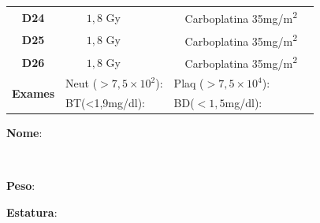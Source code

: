 \documentclass[11pt,a4paper,oldfontcommands]{memoir}
\def\entrywithlabel[#1]#2{\parbox{#1}{{\small #2:} \hrulefill}}
\begin{document}
\begin{center}
\begin{table}[H]
\begin{tabular}{p{1cm}p{2cm}|p{2cm}|p{1cm}|p{4cm}|p{3cm}}
    \multicolumn{1}{c|}{\multirow{1}{*}{\textbf{D24}}}&\multicolumn{1}{c|}{\(1,8\) Gy}&&&{Carboplatina 35mg/m\textsuperscript{2}}&\\
    \multicolumn{1}{c|}{\multirow{1}{*}{\textbf{D25}}}&\multicolumn{1}{c|}{\(1,8\) Gy}&&&{Carboplatina 35mg/m\textsuperscript{2}}&\\
    \multicolumn{1}{c|}{\multirow{1}{*}{\textbf{D26}}}&\multicolumn{1}{c|}{\(1,8\) Gy}&&&{Carboplatina 35mg/m\textsuperscript{2}}&\\
    \hline
    \multicolumn{1}{c|}{\multirow{2}{*}{\textbf{Exames}}}&\multicolumn{2}{l|}{Neut (\(>7,5\times10^2\)):}&\multicolumn{2}{l|}{Plaq (\(>7,5\times10^4\)):}&\\
    \cline{2-6}
    \multicolumn{1}{c|}{\multirow{2}{*}{{}}}&\multicolumn{2}{l|}{BT(<1,9mg/dl):}&\multicolumn{2}{l|}{BD(\(<1,5\)mg/dl):}&
    \\
    \hline
\end{tabular}
\end{table}
\pagebreak
    \noindent
\entrywithlabel[1\hsize]{\textbf{Nome}}\hfill
\\[0.3cm]
\entrywithlabel[.45\hsize]{\textbf{Peso}}\hfill  \entrywithlabel[.45\hsize]{\textbf{Estatura}}


\end{center}
\end{document}
